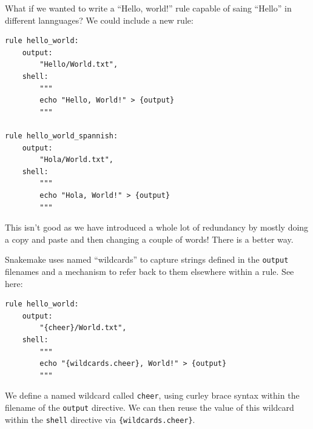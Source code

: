 What if we wanted to write a ``Hello, world!'' rule capable of saing ``Hello'' in different lannguages? We could include a new rule:

\begin{lstlisting}
rule hello_world:
	output:
		"Hello/World.txt",
	shell:
		"""
		echo "Hello, World!" > {output}
		"""

rule hello_world_spannish:
	output:
		"Hola/World.txt",
	shell:
		"""
		echo "Hola, World!" > {output}
		"""
\end{lstlisting}

This isn't good as we have introduced a whole lot of redundancy by mostly doing a copy and paste and then changing a couple of words! There is a better way.

Snakemake uses named ``wildcards'' to capture strings defined in the \texttt{output} filenames and a mechanism to refer back to them elsewhere within a rule. See here:

\begin{lstlisting}
rule hello_world:
	output:
		"{cheer}/World.txt",
	shell:
		"""
		echo "{wildcards.cheer}, World!" > {output}
		"""
\end{lstlisting}

We define a named wildcard called \texttt{cheer}, using curley brace syntax within the filename of the \texttt{output} directive. We can then reuse
the value of this wildcard within the \texttt{shell} directive via \texttt{\{wildcards.cheer\}}.

